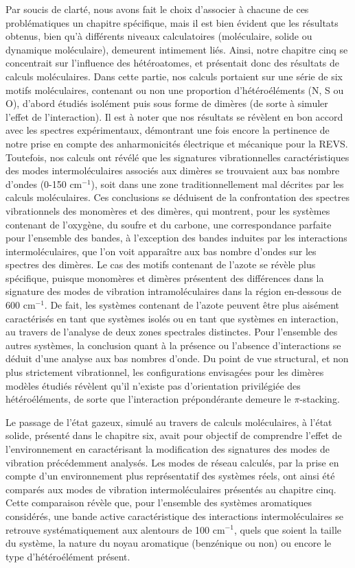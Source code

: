 	Par soucis de clarté, nous avons fait le choix d'associer à chacune de ces problématiques un chapitre spécifique, mais il est bien évident que les résultats obtenus, bien qu'à différents niveaux calculatoires (moléculaire, solide ou dynamique moléculaire), demeurent intimement liés. 
	Ainsi, notre chapitre cinq se concentrait sur l'influence des hétéroatomes, et présentait donc des résultats de calculs moléculaires. Dans cette partie, nos calculs portaient sur une série de six motifs moléculaires, contenant ou non une proportion d'hétéroéléments (N, S ou O), d'abord étudiés isolément puis sous forme de dimères (de sorte à simuler l'effet de l'interaction). Il est à noter que nos résultats se révèlent en bon accord avec les spectres expérimentaux, démontrant une fois encore la pertinence de notre prise en compte des anharmonicités électrique et mécanique pour la REVS. Toutefois, nos calculs ont révélé que les signatures vibrationnelles caractéristiques des modes intermoléculaires associés aux dimères se trouvaient aux bas nombre d'ondes (0-150 cm$^{-1}$), soit dans une zone traditionnellement mal décrites par les calculs moléculaires. Ces conclusions se déduisent de la confrontation des spectres vibrationnels des monomères et des dimères, qui montrent, pour les systèmes contenant de l'oxygène, du soufre et du carbone, une correspondance parfaite pour l'ensemble des bandes, à l'exception des bandes induites par les interactions intermoléculaires, que l'on voit apparaître aux bas nombre d'ondes sur les spectres des dimères. Le cas des motifs contenant de l'azote se révèle plus spécifique, puisque monomères et dimères présentent des différences dans la signature des modes de vibration intramoléculaires dans la région en-dessous de 600 cm$^{-1}$. De fait, les systèmes contenant de l'azote peuvent être plus aisément caractérisés en tant que systèmes isolés ou en tant que systèmes en interaction, au travers de l'analyse de deux zones spectrales distinctes. Pour l'ensemble des autres systèmes, la conclusion quant à la présence ou l'absence d'interactions se déduit d'une analyse aux bas nombres d'onde. 	
Du point de vue structural, et non plus strictement vibrationnel, les configurations envisagées pour les dimères modèles étudiés révèlent qu'il n'existe pas d'orientation privilégiée des hétéroéléments, de sorte que l'interaction prépondérante demeure le $\pi$-stacking. 	

	
	Le passage de l'état gazeux, simulé au travers de calculs moléculaires, à l'état solide, présenté dans le chapitre six, avait pour objectif de comprendre l'effet de l'environnement en caractérisant la modification des signatures des modes de vibration précédemment analysés. Les modes de réseau calculés, par la prise en compte d'un environnement plus représentatif des systèmes réels, ont ainsi été comparés aux modes de vibration intermoléculaires présentés au chapitre cinq. Cette comparaison révèle que, pour l'ensemble des systèmes aromatiques considérés, une bande active caractéristique des interactions intermoléculaires se retrouve systématiquement aux alentours de 100 cm$^{-1}$, quels que soient la taille du système, la nature du noyau aromatique (benzénique ou non) ou encore le type d'hétéroélément présent. 

